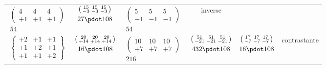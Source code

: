 \begin{center}
\begin{tabular}{ccccc l}
$\begin{gathered}\left(\begin{smallmatrix}4&4&4\\+1&+1&+1\end{smallmatrix}\right)\\54\end{gathered}$&
$\begin{gathered}\left(\begin{smallmatrix}15&15&15\\-3&-3&-3\end{smallmatrix}\right)\\27\pdot108\end{gathered}$&
$\begin{gathered}\left(\begin{smallmatrix}5&5&5\\-1&-1&-1\end{smallmatrix}\right)\\54\end{gathered}$&inverse\\[1.4ex]
$\left\{\begin{smallmatrix}+2&+1&+1\\+1&+2&+1\\+1&+1&+2\end{smallmatrix}\right\}$&
$\begin{gathered}\left(\begin{smallmatrix}20&20&20\\+14&+14&+14\end{smallmatrix}\right)\\16\pdot108\end{gathered}$&
$\begin{gathered}\left(\begin{smallmatrix}10&10&10\\+7&+7&+7\end{smallmatrix}\right)\\216\end{gathered}$&
$\begin{gathered}\left(\begin{smallmatrix}51&51&51\\-21&-21&-21\end{smallmatrix}\right)\\432\pdot108\end{gathered}$&
$\begin{gathered}\left(\begin{smallmatrix}17&17&17\\-7&-7&-7\end{smallmatrix}\right)\\16\pdot108\end{gathered}$&contrastante\\[1.4ex]

\end{tabular}
\end{center}
